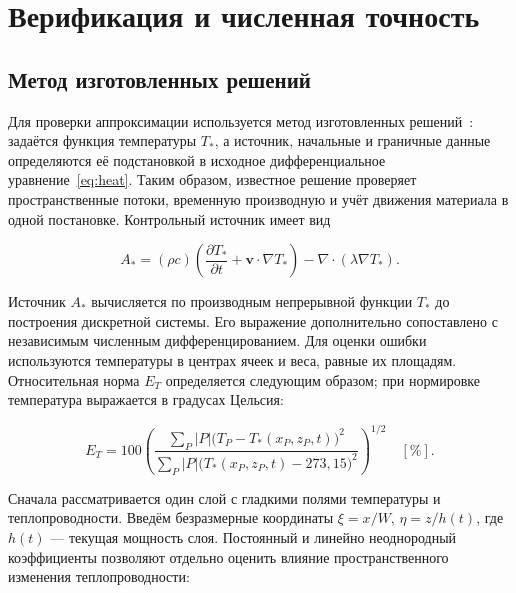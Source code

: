 \section{Верификация и численная точность}
\label{sec:verification}

\subsection{Метод изготовленных решений}

Для проверки аппроксимации используется метод изготовленных
решений~\cite{salari2000}: задаётся функция температуры $T_*$,
а источник, начальные и граничные данные определяются её подстановкой
в исходное дифференциальное уравнение~\eqref{eq:heat}.
Таким образом, известное решение проверяет пространственные потоки,
временную производную и учёт движения материала в одной постановке.
Контрольный источник имеет вид

\begin{equation}
 A_*=(\rho c)\left(\frac{\partial T_*}{\partial t}
       +\boldsymbol v\cdot\nabla T_*\right)-\nabla\cdot(\lambda\nabla T_*).
\end{equation}

Источник $A_*$ вычисляется по производным непрерывной функции $T_*$
до построения дискретной системы. Его выражение дополнительно
сопоставлено с независимым численным дифференцированием.
Для оценки ошибки используются температуры в центрах ячеек
и веса, равные их площадям. Относительная норма $E_T$ определяется
следующим образом; при нормировке температура выражается
в градусах Цельсия:

\begin{equation}
 E_T=100\left(\frac{\sum_P|P|\bigl(T_P-T_*(x_P,z_P,t)\bigr)^2}
 {\sum_P|P|\bigl(T_*(x_P,z_P,t)-273{,}15\bigr)^2}\right)^{1/2}\quad[\%].
\end{equation}

Сначала рассматривается один слой с гладкими полями температуры
и теплопроводности. Введём безразмерные координаты
$\xi=x/W$, $\eta=z/h(t)$, где $h(t)$ --- текущая мощность слоя.
Постоянный и линейно неоднородный коэффициенты позволяют отдельно
оценить влияние пространственного изменения теплопроводности:

